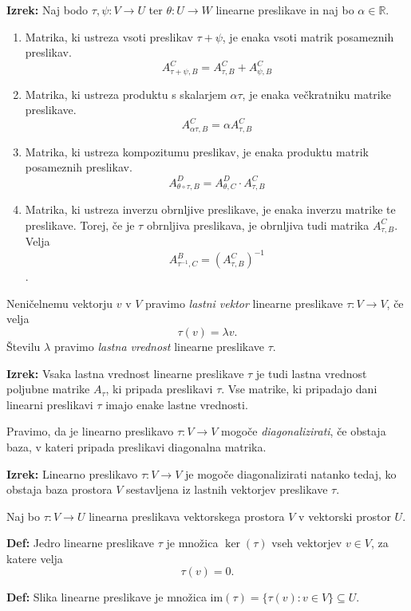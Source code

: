 \documentclass{article}
\begin{document}
\begin{multicols}{2}
	\textbf{Izrek:} Naj bodo \( \tau, \psi: V \to U \) ter \( \theta: U \to W \) linearne preslikave in naj bo \( \alpha \in \mathbb{R} \).
	\begin{enumerate}
		\item Matrika, ki ustreza vsoti preslikav \( \tau + \psi \), je enaka vsoti matrik posameznih preslikav.
		      \[ A_{\tau+\psi,B}^C = A_{\tau,B}^C + A_{\psi,B}^C \]
		\item Matrika, ki ustreza produktu s skalarjem \( \alpha\tau \), je enaka večkratniku matrike preslikave.
		      \[ A_{\alpha\tau,B}^C = \alpha A_{\tau,B}^C \]
		\item Matrika, ki ustreza kompozitumu preslikav, je enaka produktu matrik posameznih preslikav.
		      \[ A_{\theta\circ\tau,B}^D = A_{\theta,C}^D \cdot A_{\tau,B}^C \]
		\item Matrika, ki ustreza inverzu obrnljive preslikave, je enaka inverzu matrike te preslikave. Torej, če je \( \tau \) obrnljiva preslikava, je obrnljiva tudi matrika \( A_{\tau,B}^C \). Velja
		      \[ A_{\tau^{-1},C}^B = (A_{\tau,B}^C)^{-1} \].
	\end{enumerate}


	Neničelnemu vektorju \( v \) v \( V \) pravimo \textit{lastni vektor} linearne preslikave \( \tau: V \to V \), če velja
	\[ \tau(v) = \lambda v. \]
	Številu \( \lambda \) pravimo \textit{lastna vrednost} linearne preslikave \( \tau \).

	\textbf{Izrek:} Vsaka lastna vrednost linearne preslikave \( \tau \) je tudi lastna vrednost poljubne matrike \( A_{\tau} \), ki pripada preslikavi \( \tau \). Vse matrike, ki pripadajo dani linearni preslikavi \( \tau \) imajo enake lastne vrednosti.

	Pravimo, da je linearno preslikavo \( \tau: V \to V \) mogoče \textit{diagonalizirati}, če obstaja baza, v kateri pripada preslikavi diagonalna matrika.

	\textbf{Izrek:} Linearno preslikavo \( \tau: V \to V \) je mogoče diagonalizirati natanko tedaj, ko obstaja baza prostora \( V \) sestavljena iz lastnih vektorjev preslikave \( \tau \).

	Naj bo \( \tau: V \rightarrow U \) linearna preslikava vektorskega prostora \( V \) v vektorski prostor \( U \).

	\textbf{Def:} Jedro linearne preslikave \( \tau \) je množica \( \ker(\tau) \) vseh vektorjev \( v \in V \), za katere velja
	\[ \tau(v) = 0. \]

	\textbf{Def:} Slika linearne preslikave je množica \( \text{im}(\tau) = \{ \tau(v) : v \in V \} \subseteq U \).


\end{multicols}
\end{document}
